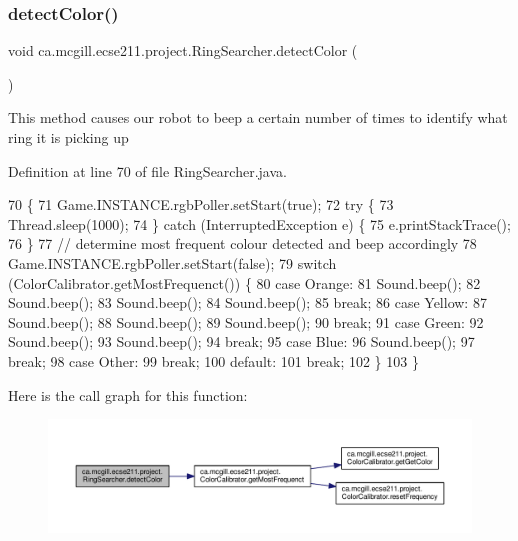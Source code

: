 \subsubsection{\texorpdfstring{detect\+Color()}{detectColor()}}
{\footnotesize\ttfamily void ca.\+mcgill.\+ecse211.\+project.\+Ring\+Searcher.\+detect\+Color (\begin{DoxyParamCaption}{ }\end{DoxyParamCaption})}

This method causes our robot to beep a certain number of times to identify what ring it is picking up 

Definition at line 70 of file Ring\+Searcher.\+java.


\begin{DoxyCode}
70                             \{
71     Game.INSTANCE.rgbPoller.setStart(\textcolor{keyword}{true});
72     \textcolor{keywordflow}{try} \{
73       Thread.sleep(1000);
74     \} \textcolor{keywordflow}{catch} (InterruptedException e) \{
75       e.printStackTrace();
76     \}
77     \textcolor{comment}{// determine most frequent colour detected and beep accordingly}
78     Game.INSTANCE.rgbPoller.setStart(\textcolor{keyword}{false});
79     \textcolor{keywordflow}{switch} (ColorCalibrator.getMostFrequenct()) \{
80       \textcolor{keywordflow}{case} Orange:
81         Sound.beep();
82         Sound.beep();
83         Sound.beep();
84         Sound.beep();
85         \textcolor{keywordflow}{break};
86       \textcolor{keywordflow}{case} Yellow:
87         Sound.beep();
88         Sound.beep();
89         Sound.beep();
90         \textcolor{keywordflow}{break};
91       \textcolor{keywordflow}{case} Green:
92         Sound.beep();
93         Sound.beep();
94         \textcolor{keywordflow}{break};
95       \textcolor{keywordflow}{case} Blue:
96         Sound.beep();
97         \textcolor{keywordflow}{break};
98       \textcolor{keywordflow}{case} Other:
99         \textcolor{keywordflow}{break};
100       \textcolor{keywordflow}{default}:
101         \textcolor{keywordflow}{break};
102     \}
103   \}
\end{DoxyCode}
Here is the call graph for this function\+:\nopagebreak
\begin{figure}[H]
\begin{center}
\leavevmode
\includegraphics[width=350pt]{classca_1_1mcgill_1_1ecse211_1_1project_1_1_ring_searcher_a997bf874ae5577c48719254677830fb7_cgraph}
\end{center}
\end{figure}
